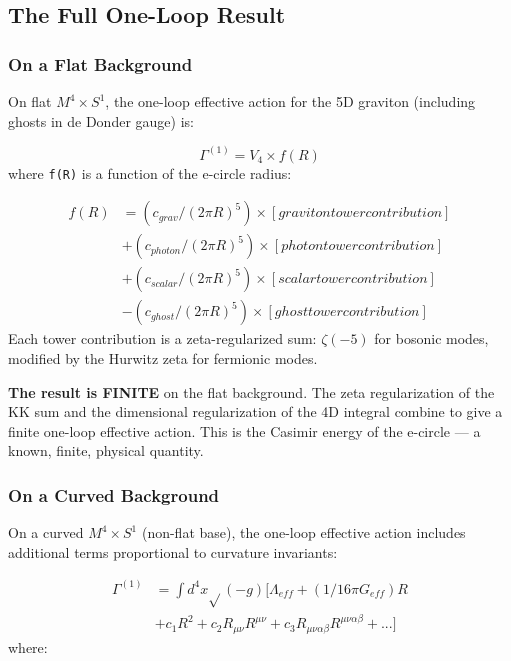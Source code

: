 \documentclass[aps,prd,preprint,superscriptaddress,longbibliography,floatfix]{revtex4-2}
\theoremstyle{remark}
\begin{document}
\subsection{The Full One-Loop Result}


\subsubsection{On a Flat Background}

On flat $M^{4} \times S^{1}$, the one-loop effective action for the 5D graviton (including ghosts in de Donder gauge) is:


\begin{equation}
    \Gamma^{(1)} = V_{4} \times f(R)
\end{equation}
where \texttt{f(R)} is a function of the e-circle radius:


\begin{align}
    f(R) &= (c_{grav}/(2\pi R)^{5}) \times [graviton tower contribution] \\
    & + (c_{photon}/(2\pi R)^{5}) \times [photon tower contribution] \\
    & + (c_{scalar}/(2\pi R)^{5}) \times [scalar tower contribution] \\
    & - (c_{ghost}/(2\pi R)^{5}) \times [ghost tower contribution]
\end{align}
Each tower contribution is a zeta-regularized sum: $\zeta(-5)$ for bosonic modes, modified by the Hurwitz zeta for fermionic modes.

\textbf{The result is FINITE} on the flat background. The zeta regularization of the KK sum and the dimensional regularization of the 4D integral combine to give a finite one-loop effective action. This is the Casimir energy of the e-circle --- a known, finite, physical quantity.


\subsubsection{On a Curved Background}

On a curved $M^{4} \times S^{1}$ (non-flat base), the one-loop effective action includes additional terms proportional to curvature invariants:


\begin{align}
    \Gamma^{(1)} &= \int d^{4}x \sqrt{}(-g) [\Lambda_{eff} + (1/16\pi G_{eff}) R \\
    & + c_{1} R^{2} + c_{2} R_{\mu\nu}R^{\mu\nu} + c_{3} R_{\mu\nu\alpha\beta}R^{\mu\nu\alpha\beta} + ...]
\end{align}
where:
\end{document}
